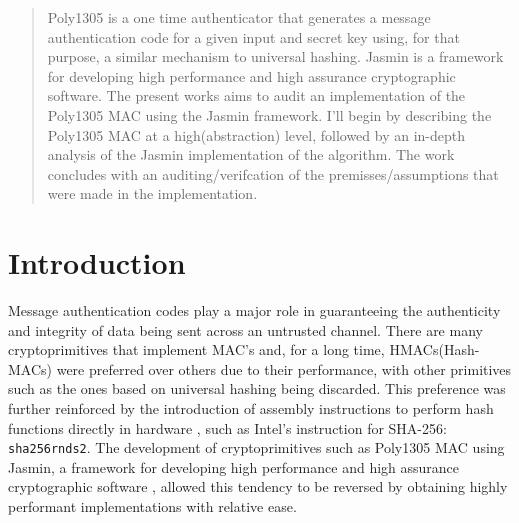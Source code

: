 \documentclass[twocolumn]{article}
\begin{document}

\begin{abstract}
    Poly1305 is a one time authenticator that generates a message authentication code for a given input and secret key using, for that purpose, a similar mechanism to
    universal hashing. Jasmin is a framework for developing high performance and high assurance cryptographic software. The present works aims to audit an implementation 
    of the Poly1305 MAC using the Jasmin framework. I'll begin by describing the Poly1305 MAC at a high(abstraction) level, followed by an in-depth analysis of the Jasmin 
    implementation of the algorithm. The work concludes with an auditing/verifcation of the premisses/assumptions that were made in the implementation.
\end{abstract}

\section{Introduction}
Message authentication codes play a major role in guaranteeing the authenticity and integrity of data being sent across an untrusted channel. There are many 
cryptoprimitives that implement MAC's and, for a long time, HMACs(Hash-MACs) were preferred over others due to their performance, with other primitives such 
as the ones based on universal hashing being discarded. This preference was further reinforced by the introduction of assembly instructions to perform hash 
functions directly in hardware \cite{sha_extensions}, such as Intel's instruction for SHA-256: \texttt{sha256rnds2}. The development of cryptoprimitives 
such as Poly1305 MAC using Jasmin, a framework for developing high performance and high assurance cryptographic software \cite{jasmin_paper}, allowed this tendency 
to be reversed by obtaining highly performant implementations with relative ease.
\end{document}
